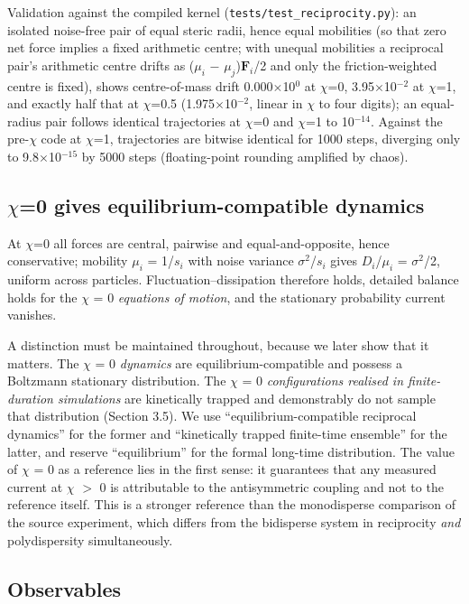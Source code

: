 \documentclass[aps,pre,preprint,superscriptaddress,nofootinbib,longbibliography]{revtex4-2}
\begin{document}
Validation against the compiled kernel (\texttt{tests/test\_reciprocity.py}): an isolated noise-free pair of equal steric radii, hence equal mobilities (so that zero net force implies a fixed arithmetic centre; with unequal mobilities a reciprocal pair's arithmetic centre drifts as ($\mu_{i}$ $-$ $\mu_{j}$)$\mathbf{F}_{i}$/2 and only the friction-weighted centre is fixed), shows centre-of-mass drift 0.000$\times$10$^{0}$ at $\chi$=0, 3.95$\times$10$^{-2}$ at $\chi$=1, and exactly half that at $\chi$=0.5 (1.975$\times$10$^{-2}$, linear in $\chi$ to four digits); an equal-radius pair follows identical trajectories at $\chi$=0 and $\chi$=1 to 10$^{-14}$. Against the pre-$\chi$ code at $\chi$=1, trajectories are bitwise identical for 1000 steps, diverging only to 9.8$\times$10$^{-15}$ by 5000 steps (floating-point rounding amplified by chaos).

\subsection{$\chi$=0 gives equilibrium-compatible dynamics}

At $\chi$=0 all forces are central, pairwise and equal-and-opposite, hence conservative; mobility $\mu_{i}$ = 1/$s_{i}$ with noise variance $\sigma ^{2}$/$s_{i}$ gives $D_{i}$/$\mu_{i}$ = $\sigma ^{2}$/2, uniform across particles. Fluctuation--dissipation therefore holds, detailed balance holds for the $\chi$ = 0 \emph{equations of motion}, and the stationary probability current vanishes.

A distinction must be maintained throughout, because we later show that it matters. The $\chi$ = 0 \emph{dynamics} are equilibrium-compatible and possess a Boltzmann stationary distribution. The $\chi$ = 0 \emph{configurations realised in finite-duration simulations} are kinetically trapped and demonstrably do not sample that distribution (Section 3.5). We use ``equilibrium-compatible reciprocal dynamics'' for the former and ``kinetically trapped finite-time ensemble'' for the latter, and reserve ``equilibrium'' for the formal long-time distribution. The value of $\chi$ = 0 as a reference lies in the first sense: it guarantees that any measured current at $\chi$ $>$ 0 is attributable to the antisymmetric coupling and not to the reference itself. This is a stronger reference than the monodisperse comparison of the source experiment, which differs from the bidisperse system in reciprocity \emph{and} polydispersity simultaneously.

\subsection{Observables}
\end{document}
